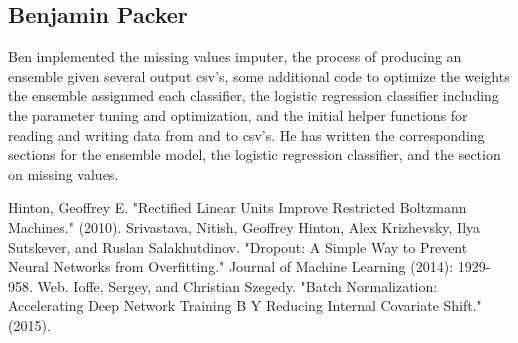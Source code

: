 \documentclass[twoside,11pt]{article}
\theoremstyle{definition}
\begin{document}
  \subsection{Benjamin Packer}
    Ben implemented the missing values imputer, the process of producing an ensemble given several output csv's, some additional code to optimize the weights the ensemble assignmed each classifier, the logistic regression classifier including the parameter tuning and optimization, and the initial helper functions for reading and writing data from and to csv's. He has written the corresponding sections for the ensemble model, the logistic regression classifier, and the section on missing values.

\begin{thebibliography}{1}
    Hinton, Geoffrey E. "Rectified Linear Units Improve Restricted Boltzmann Machines." (2010). 
    Srivastava, Nitish, Geoffrey Hinton, Alex Krizhevsky, Ilya Sutskever, and Ruslan Salakhutdinov. "Dropout: A Simple Way to Prevent Neural Networks from Overfitting." Journal of Machine Learning (2014): 1929-958. Web. 
    Ioffe, Sergey, and Christian Szegedy. "Batch Normalization: Accelerating Deep Network Training B Y Reducing Internal Covariate Shift." (2015).
\end{thebibliography}
\end{document}
